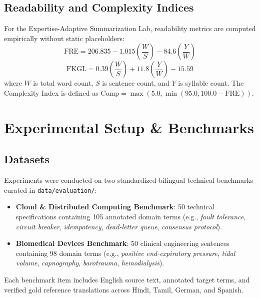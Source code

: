 \documentclass[conference]{IEEEtran}
\begin{document}
\subsection{Readability and Complexity Indices}
For the Expertise-Adaptive Summarization Lab, readability metrics are computed empirically without static placeholders:
\begin{equation}
\text{FRE} = 206.835 - 1.015 \left(\frac{W}{S}\right) - 84.6 \left(\frac{Y}{W}\right)
\end{equation}
\begin{equation}
\text{FKGL} = 0.39 \left(\frac{W}{S}\right) + 11.8 \left(\frac{Y}{W}\right) - 15.59
\end{equation}
where $W$ is total word count, $S$ is sentence count, and $Y$ is syllable count. The Complexity Index is defined as $\text{Comp} = \max(5.0, \min(95.0, 100.0 - \text{FRE}))$.

\section{Experimental Setup \& Benchmarks}

\subsection{Datasets}
Experiments were conducted on two standardized bilingual technical benchmarks curated in \texttt{data/evaluation/}:
\begin{itemize}
    \item \textbf{Cloud \& Distributed Computing Benchmark}: 50 technical specifications containing 105 annotated domain terms (e.g., \textit{fault tolerance}, \textit{circuit breaker}, \textit{idempotency}, \textit{dead-letter queue}, \textit{consensus protocol}).
    \item \textbf{Biomedical Devices Benchmark}: 50 clinical engineering sentences containing 98 domain terms (e.g., \textit{positive end-expiratory pressure}, \textit{tidal volume}, \textit{capnography}, \textit{barotrauma}, \textit{hemodialysis}).
\end{itemize}
Each benchmark item includes English source text, annotated target terms, and verified gold reference translations across Hindi, Tamil, German, and Spanish.
\end{document}

